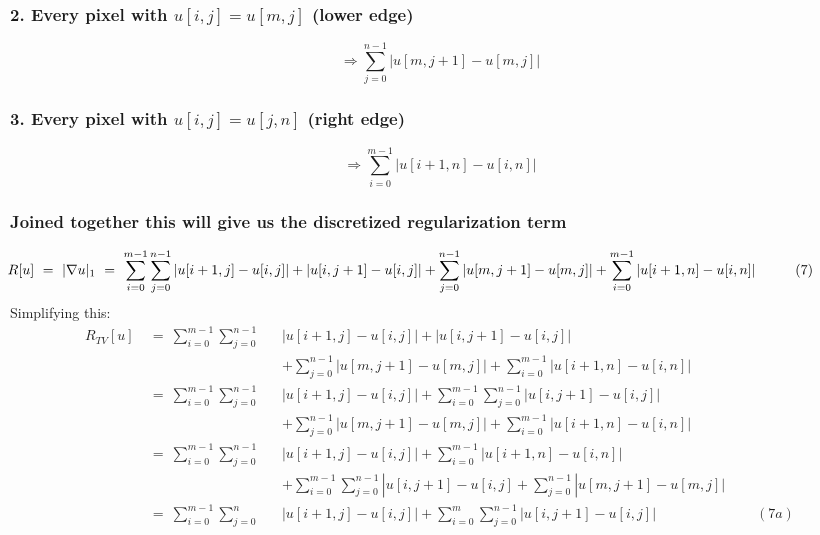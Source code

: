 \documentclass{report}
\begin{document}
			\subsubsection{2. Every pixel with $u[i,j] = u[m,j]$ (lower edge)}
			\[
				\Rightarrow \sum_{j=0}^{n-1} | u[m,j+1] - u[m,j] |
			\]
			\subsubsection{3. Every pixel with $u[i,j] = u[j,n]$ (right edge)}
			\[
				\Rightarrow \sum_{i=0}^{m-1} | u[i+1,n] - u[i,n] |
			\]
			\subsubsection{Joined together this will give us the discretized regularization term}
				\[
					\hspace{-1.5cm} R[u] \ = \ | \nabla u | _1 \ = \ \sum_{i=0}^{m-1} \sum_{j=0}^{n-1} | u[i+1,j] - u[i,j] | + | u[i,j+1] - u[i,j] | + \sum_{j=0}^{n-1} | u[m,j+1] - u[m,j] | + \sum_{i=0}^{m-1} | u[i+1,n] - u[i,n] | \hspace{1cm} (7)
				\]
				Simplifying this:
				\begin{align*}
					R_{TV}[u] \ & = \ \sum_{i=0}^{m-1} \sum_{j=0}^{n-1} && | u[i+1,j] - u[i,j] | + | u[i,j+1] - u[i,j] | \\
					&&& + \sum_{j=0}^{n-1} | u[m,j+1] - u[m,j] | + \sum_{i=0}^{m-1} | u[i+1,n] - u[i,n] | \\
					& = \ \sum_{i=0}^{m-1} \sum_{j=0}^{n-1} && | u[i+1,j] - u[i,j] | +  \sum_{i=0}^{m-1} \sum_{j=0}^{n-1} | u[i,j+1] - u[i,j] | \\
					&&& + \sum_{j=0}^{n-1} | u[m,j+1] - u[m,j] | + \sum_{i=0}^{m-1} | u[i+1,n] - u[i,n] | \\
					& = \ \sum_{i=0}^{m-1} \sum_{j=0}^{n-1} && | u[i+1,j] - u[i,j] | + \sum_{i=0}^{m-1} | u[i+1,n] - u[i,n] | \\
					&&& + \sum_{i=0}^{m-1} \sum_{j=0}^{n-1} | u[i,j+1] - u[i,j] + \sum_{j=0}^{n-1} | u[m,j+1] - u[m,j] | \\
					& = \ \sum_{i=0}^{m-1} \sum_{j=0}^{n} && | u[i+1,j] - u[i,j] | + \sum_{i=0}^{m} \sum_{j=0}^{n-1} | u[i,j+1] - u[i,j] | \hspace{3cm} (7a)
				\end{align*}
		\closesection
\end{document}
